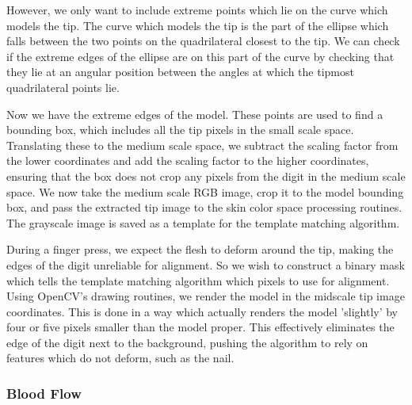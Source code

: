 However, we only want to include extreme points which lie on the curve which models the tip. The curve which models the tip is the part of the ellipse which falls between the two points on the quadrilateral closest to the tip. We can check if the extreme edges of the ellipse are on this part of the curve by checking that they lie at an angular position between the angles at which the tipmost quadrilateral points lie.

Now we have the extreme edges of the model. These points are used to find a bounding box, which includes all the tip pixels in the small scale space. Translating these to the medium scale space, we subtract the scaling factor from the lower coordinates and add the scaling factor to the higher coordinates, ensuring that the box does not crop any pixels from the digit in the medium scale space. We now take the medium scale RGB image, crop it to the model bounding box, and pass the extracted tip image to the skin color space processing routines. The grayscale image is saved as a template for the template matching algorithm.

During a finger press, we expect the flesh to deform around the tip, making the edges of the digit unreliable for alignment. So we wish to construct a binary mask which tells the template matching algorithm which pixels to use for alignment. Using OpenCV's drawing routines, we render the model in the midscale tip image coordinates. This is done in a way which actually renders the model 'slightly' by four or five pixels smaller than the model proper. This effectively eliminates the edge of the digit next to the background, pushing the algorithm to rely on features which do not deform, such as the nail.

\subsubsection{Blood Flow}\label{sec:BloodFlow}

